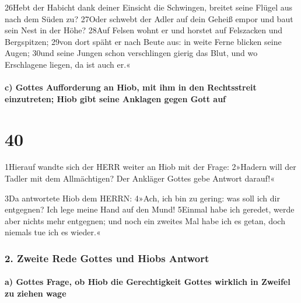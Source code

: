 26Hebt der Habicht dank deiner Einsicht die Schwingen, breitet seine
Flügel aus nach dem Süden zu? 27Oder schwebt der Adler auf dein Geheiß
empor und baut sein Nest in der Höhe? 28Auf Felsen wohnt er und horstet
auf Felszacken und Bergspitzen; 29von dort späht er nach Beute aus: in
weite Ferne blicken seine Augen; 30und seine Jungen schon verschlingen
gierig das Blut, und wo Erschlagene liegen, da ist auch er.«

\hypertarget{c-gottes-aufforderung-an-hiob-mit-ihm-in-den-rechtsstreit-einzutreten-hiob-gibt-seine-anklagen-gegen-gott-auf}{%
\paragraph{c) Gottes Aufforderung an Hiob, mit ihm in den Rechtsstreit
einzutreten; Hiob gibt seine Anklagen gegen Gott
auf}\label{c-gottes-aufforderung-an-hiob-mit-ihm-in-den-rechtsstreit-einzutreten-hiob-gibt-seine-anklagen-gegen-gott-auf}}

\hypertarget{section-39}{%
\section{40}\label{section-39}}

1Hierauf wandte sich der HERR weiter an Hiob mit der Frage: 2»Hadern
will der Tadler mit dem Allmächtigen? Der Ankläger Gottes gebe Antwort
darauf!«

3Da antwortete Hiob dem HERRN: 4»Ach, ich bin zu gering: was soll ich
dir entgegnen? Ich lege meine Hand auf den Mund! 5Einmal habe ich
geredet, werde aber nichts mehr entgegnen; und noch ein zweites Mal habe
ich es getan, doch niemals tue ich es wieder.«

\hypertarget{zweite-rede-gottes-und-hiobs-antwort}{%
\subsubsection{2. Zweite Rede Gottes und Hiobs
Antwort}\label{zweite-rede-gottes-und-hiobs-antwort}}

\hypertarget{a-gottes-frage-ob-hiob-die-gerechtigkeit-gottes-wirklich-in-zweifel-zu-ziehen-wage}{%
\paragraph{a) Gottes Frage, ob Hiob die Gerechtigkeit Gottes wirklich in
Zweifel zu ziehen
wage}\label{a-gottes-frage-ob-hiob-die-gerechtigkeit-gottes-wirklich-in-zweifel-zu-ziehen-wage}}


